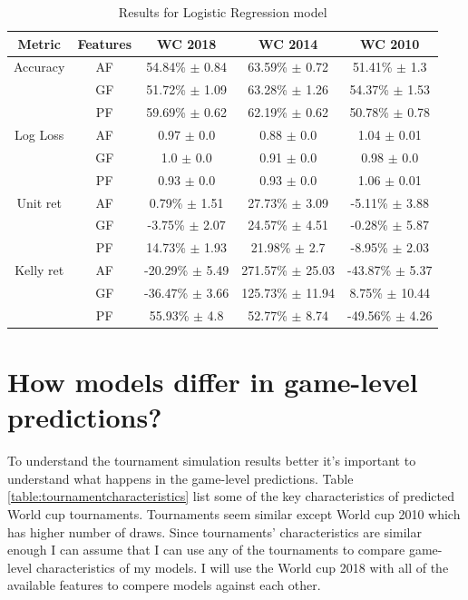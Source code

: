 \begin{table}
    \caption{Results for Logistic Regression model}
    \begin{tabular}{| c  c| c| c| c|}
        \hline
        Metric&Features& \textbf{WC 2018} & \textbf{WC 2014} & \textbf{WC 2010}\\
        \hline
        Accuracy & AF & 54.84\% $\pm$ 0.84 & 63.59\% $\pm$ 0.72 & 51.41\% $\pm$ 1.3 \\
 & GF & 51.72\% $\pm$ 1.09 & 63.28\% $\pm$ 1.26 & 54.37\% $\pm$ 1.53 \\
 & PF & 59.69\% $\pm$ 0.62 & 62.19\% $\pm$ 0.62 & 50.78\% $\pm$ 0.78 \\
 \hline
Log Loss & AF & 0.97 $\pm$ 0.0 & 0.88 $\pm$ 0.0 & 1.04 $\pm$ 0.01 \\
 & GF & 1.0 $\pm$ 0.0 & 0.91 $\pm$ 0.0 & 0.98 $\pm$ 0.0 \\
 & PF & 0.93 $\pm$ 0.0 & 0.93 $\pm$ 0.0 & 1.06 $\pm$ 0.01 \\
 \hline
Unit ret & AF & 0.79\% $\pm$ 1.51 & 27.73\% $\pm$ 3.09 & -5.11\% $\pm$ 3.88 \\
 & GF & -3.75\% $\pm$ 2.07 & 24.57\% $\pm$ 4.51 & -0.28\% $\pm$ 5.87 \\
 & PF & 14.73\% $\pm$ 1.93 & 21.98\% $\pm$ 2.7 & -8.95\% $\pm$ 2.03 \\
 \hline
Kelly ret & AF & -20.29\% $\pm$ 5.49 & 271.57\% $\pm$ 25.03 & -43.87\% $\pm$ 5.37 \\
 & GF & -36.47\% $\pm$ 3.66 & 125.73\% $\pm$ 11.94 & 8.75\% $\pm$ 10.44 \\
 & PF & 55.93\% $\pm$ 4.8 & 52.77\% $\pm$ 8.74 & -49.56\% $\pm$ 4.26 \\
 \hline
    \end{tabular}
    \label{table:linearmodel}
\end{table}

\section{How models differ in game-level predictions?}
To understand the tournament simulation results better it's important to understand what happens in the game-level predictions. Table \ref{table:tournamentcharacteristics} list some of the key characteristics of predicted World cup tournaments. Tournaments seem similar except World cup 2010 which has higher number of draws. Since tournaments' characteristics are similar enough I can assume that I can use any of the tournaments to compare game-level characteristics of my models. I will use the World cup 2018 with all of the available features to compere models against each other.

